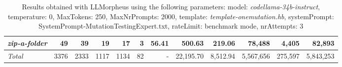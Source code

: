 \begin{table*}
{\begin{tabular}{l||r|r|r|r|r|r||r|r||r|r|r}
   \hline
   \textit{zip-a-folder} & 49 & 39 & 19 & 17 & 3 & 56.41 & 500.63 & 219.06 & 78,488 & 4,405 & 82,893 \\ 
   \hline
   \textit{Total} & 3376 & 2333 & 1117 & 1134 & 82 & - & 22,195.70  & 8,512.94 & 5,567,656 & 275,597 & 5,843,253 \\ 
 \end{tabular}
 }
 \caption{Results obtained with LLMorpheus using the following parameters: 
   model: \textit{codellama-34b-instruct}, 
   temperature: 0, 
   MaxTokens: 250, 
   MaxNrPrompts: 2000, 
   template: \textit{template-onemutation.hb}, 
   systemPrompt: SystemPrompt-MutationTestingExpert.txt, 
   rateLimit: benchmark mode, 
   nrAttempts: 3  
 }
\end{table*}

